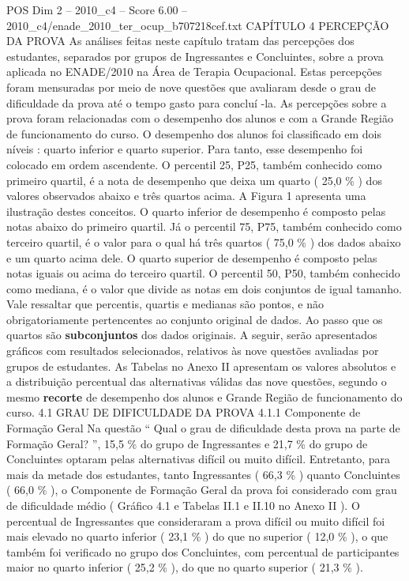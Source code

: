 \begin{textsample}{POS Dim 2 – 2010\_c4 – Score 6.00 – 2010\_c4/enade\_2010\_ter\_ocup\_b707218cef.txt}  \label{ex:f2_pos_147}
CAPÍTULO 4 PERCEPÇÃO DA PROVA As análises feitas neste capítulo tratam das percepções dos estudantes, separados por grupos de Ingressantes e Concluintes, sobre a prova aplicada no ENADE/2010 na Área de Terapia Ocupacional.
Estas percepções foram mensuradas por meio de nove questões que avaliaram desde o grau de dificuldade da prova até o tempo gasto para concluí -la.
As percepções sobre a prova foram relacionadas com o desempenho dos alunos e com a Grande Região de funcionamento do curso.
O desempenho dos alunos foi classificado em dois níveis : quarto inferior e quarto superior.
Para tanto, esse desempenho foi colocado em ordem ascendente.
O percentil 25, P25, também conhecido como primeiro quartil, é a nota de desempenho que deixa um quarto ( 25,0 \% ) dos valores observados abaixo e três quartos acima.
A Figura 1 apresenta uma ilustração destes conceitos.
O quarto inferior de desempenho é composto pelas notas abaixo do primeiro quartil.
Já o percentil 75, P75, também conhecido como terceiro quartil, é o valor para o qual há três quartos ( 75,0 \% ) dos dados abaixo e um quarto acima dele.
O quarto superior de desempenho é composto pelas notas iguais ou acima do terceiro quartil.
O percentil 50, P50, também conhecido como mediana, é o valor que divide as notas em dois conjuntos de igual tamanho.
Vale ressaltar que percentis, quartis e medianas são pontos, e não obrigatoriamente pertencentes ao conjunto original de dados.
Ao passo que os quartos são \textbf{subconjuntos} dos dados originais.
A seguir, serão apresentados gráficos com resultados selecionados, relativos às nove questões avaliadas por grupos de estudantes.
As Tabelas no Anexo II apresentam os valores absolutos e a distribuição percentual das alternativas válidas das nove questões, segundo o mesmo \textbf{recorte} de desempenho dos alunos e Grande Região de funcionamento do curso. 4.1 GRAU DE DIFICULDADE DA PROVA 4.1.1 Componente de Formação Geral Na questão “ Qual o grau de dificuldade desta prova na parte de Formação Geral? ”, 15,5 \% do grupo de Ingressantes e 21,7 \% do grupo de Concluintes optaram pelas alternativas difícil ou muito difícil.
Entretanto, para mais da metade dos estudantes, tanto Ingressantes ( 66,3 \% ) quanto Concluintes ( 66,0 \% ), o Componente de Formação Geral da prova foi considerado com grau de dificuldade médio ( Gráfico 4.1 e Tabelas II.1 e II.10 no Anexo II ).
O percentual de Ingressantes que consideraram a prova difícil ou muito difícil foi mais elevado no quarto inferior ( 23,1 \% ) do que no superior ( 12,0 \% ), o que também foi verificado no grupo dos Concluintes, com percentual de participantes maior no quarto inferior ( 25,2 \% ), do que no quarto superior ( 21,3 \% ).

\end{textsample}
